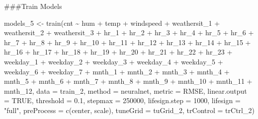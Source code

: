 \documentclass[
]{article}
\newenvironment{Shaded}{\begin{snugshade}}{\end{snugshade}}
\newcommand{\AttributeTok}[1]{\textcolor[rgb]{0.77,0.63,0.00}{#1}}
\newcommand{\ConstantTok}[1]{\textcolor[rgb]{0.00,0.00,0.00}{#1}}
\newcommand{\DecValTok}[1]{\textcolor[rgb]{0.00,0.00,0.81}{#1}}
\newcommand{\FloatTok}[1]{\textcolor[rgb]{0.00,0.00,0.81}{#1}}
\newcommand{\FunctionTok}[1]{\textcolor[rgb]{0.00,0.00,0.00}{#1}}
\newcommand{\NormalTok}[1]{#1}
\newcommand{\OtherTok}[1]{\textcolor[rgb]{0.56,0.35,0.01}{#1}}
\newcommand{\SpecialCharTok}[1]{\textcolor[rgb]{0.00,0.00,0.00}{#1}}
\newcommand{\StringTok}[1]{\textcolor[rgb]{0.31,0.60,0.02}{#1}}
\begin{document}
\#\#\#Train Models

\begin{Shaded}
\begin{Highlighting}[]
\NormalTok{models\_5 }\OtherTok{\textless{}{-}} \FunctionTok{train}\NormalTok{(cnt }\SpecialCharTok{\textasciitilde{}}\NormalTok{ hum }\SpecialCharTok{+}\NormalTok{ temp }\SpecialCharTok{+}\NormalTok{ windspeed }\SpecialCharTok{+}\NormalTok{ weathersit\_1 }\SpecialCharTok{+}\NormalTok{ weathersit\_2 }\SpecialCharTok{+}\NormalTok{ weathersit\_3 }\SpecialCharTok{+}\NormalTok{ hr\_1 }\SpecialCharTok{+}\NormalTok{ hr\_2 }\SpecialCharTok{+}\NormalTok{ hr\_3 }\SpecialCharTok{+}\NormalTok{ hr\_4 }\SpecialCharTok{+}\NormalTok{ hr\_5 }\SpecialCharTok{+}\NormalTok{ hr\_6 }\SpecialCharTok{+}\NormalTok{ hr\_7 }\SpecialCharTok{+}\NormalTok{ hr\_8 }\SpecialCharTok{+}\NormalTok{ hr\_9 }\SpecialCharTok{+}\NormalTok{ hr\_10 }\SpecialCharTok{+}\NormalTok{ hr\_11 }\SpecialCharTok{+}\NormalTok{ hr\_12 }\SpecialCharTok{+}\NormalTok{ hr\_13 }\SpecialCharTok{+}\NormalTok{ hr\_14 }\SpecialCharTok{+}\NormalTok{ hr\_15 }\SpecialCharTok{+}\NormalTok{ hr\_16 }\SpecialCharTok{+}\NormalTok{ hr\_17 }\SpecialCharTok{+}\NormalTok{ hr\_18 }\SpecialCharTok{+}\NormalTok{ hr\_19 }\SpecialCharTok{+}\NormalTok{ hr\_20 }\SpecialCharTok{+}\NormalTok{ hr\_21 }\SpecialCharTok{+}\NormalTok{ hr\_22 }\SpecialCharTok{+}\NormalTok{ hr\_23 }\SpecialCharTok{+}\NormalTok{ weekday\_1 }\SpecialCharTok{+}\NormalTok{ weekday\_2 }\SpecialCharTok{+}\NormalTok{ weekday\_3 }\SpecialCharTok{+}\NormalTok{ weekday\_4 }\SpecialCharTok{+}\NormalTok{ weekday\_5 }\SpecialCharTok{+}\NormalTok{ weekday\_6 }\SpecialCharTok{+}\NormalTok{ weekday\_7 }\SpecialCharTok{+}\NormalTok{ mnth\_1 }\SpecialCharTok{+}\NormalTok{ mnth\_2 }\SpecialCharTok{+}\NormalTok{ mnth\_3 }\SpecialCharTok{+}\NormalTok{ mnth\_4 }\SpecialCharTok{+}\NormalTok{ mnth\_5 }\SpecialCharTok{+}\NormalTok{ mnth\_6 }\SpecialCharTok{+}\NormalTok{ mnth\_7 }\SpecialCharTok{+}\NormalTok{ mnth\_8 }\SpecialCharTok{+}\NormalTok{ mnth\_9 }\SpecialCharTok{+}\NormalTok{ mnth\_10 }\SpecialCharTok{+}\NormalTok{ mnth\_11 }\SpecialCharTok{+}\NormalTok{ mnth\_12, }\AttributeTok{data =}\NormalTok{ train\_2,}
  \AttributeTok{method =} \StringTok{\textquotesingle{}neuralnet\textquotesingle{}}\NormalTok{,}
  \AttributeTok{metric =} \StringTok{\textquotesingle{}RMSE\textquotesingle{}}\NormalTok{,}
  \AttributeTok{linear.output =} \ConstantTok{TRUE}\NormalTok{,}
  \AttributeTok{threshold =} \FloatTok{0.1}\NormalTok{,}
  \AttributeTok{stepmax =} \DecValTok{250000}\NormalTok{,}
  \AttributeTok{lifesign.step =} \DecValTok{1000}\NormalTok{,}
  \AttributeTok{lifesign =} \StringTok{"full"}\NormalTok{,}
  \AttributeTok{preProcess =} \FunctionTok{c}\NormalTok{(}\StringTok{\textquotesingle{}center\textquotesingle{}}\NormalTok{, }\StringTok{\textquotesingle{}scale\textquotesingle{}}\NormalTok{),}
  \AttributeTok{tuneGrid =}\NormalTok{ tuGrid\_2,}
  \AttributeTok{trControl =}\NormalTok{ trCtrl\_2)}
\end{Highlighting}
\end{Shaded}
\end{document}
